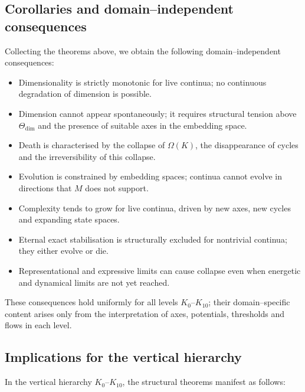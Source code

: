 \subsection{Corollaries and domain–independent consequences}

Collecting the theorems above, we obtain the following domain–independent consequences:

\begin{itemize}
    \item Dimensionality is strictly monotonic for live continua; no continuous degradation of dimension is possible.
    \item Dimension cannot appear spontaneously; it requires structural tension above \(\Theta_{\mathrm{dim}}\) and the presence of suitable axes in the embedding space.
    \item Death is characterised by the collapse of \(\Omega(K)\), the disappearance of cycles and the irreversibility of this collapse.
    \item Evolution is constrained by embedding spaces; continua cannot evolve in directions that \(M\) does not support.
    \item Complexity tends to grow for live continua, driven by new axes, new cycles and expanding state spaces.
    \item Eternal exact stabilisation is structurally excluded for nontrivial continua; they either evolve or die.
    \item Representational and expressive limits can cause collapse even when energetic and dynamical limits are not yet reached.
\end{itemize}

These consequences hold uniformly for all levels \(K_0\)–\(K_{10}\); their domain–specific content arises only from the interpretation of axes, potentials, thresholds and flows in each level.

\subsection{Implications for the vertical hierarchy}

In the vertical hierarchy \(K_0\)–\(K_{10}\), the structural theorems manifest as follows:

